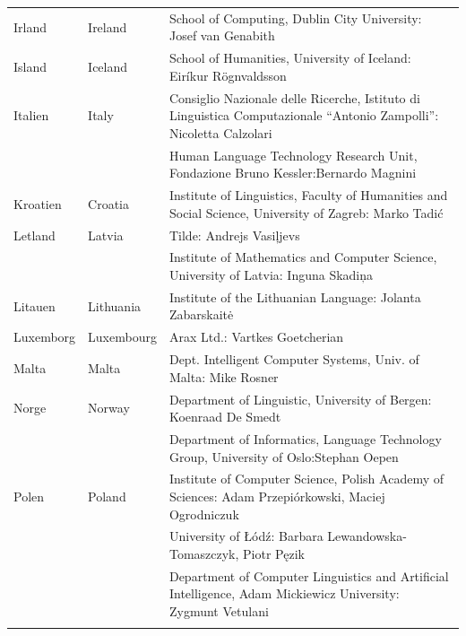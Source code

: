 \begin{longtable}{llp{105mm}}
  Irland & \textcolor{grey1}{Ireland} & School of Computing, Dublin City University: Josef van Genabith\\ \addlinespace
  
  Island & \textcolor{grey1}{Iceland} & School of Humanities, University of Iceland: Eiríkur Rögnvaldsson\\ \addlinespace
  
  Italien & \textcolor{grey1}{Italy} & Consiglio Nazionale delle Ricerche, Istituto di Linguistica Computazionale “Antonio Zampolli”: Nicoletta Calzolari\\ \addlinespace
  & & Human Language Technology Research Unit, Fondazione Bruno Kessler:\newline Bernardo Magnini\\ \addlinespace
  
  Kroatien & \textcolor{grey1}{Croatia} & Institute of Linguistics, Faculty of Humanities and Social Science, University of Zagreb: Marko Tadić \\ \addlinespace
  
  Letland & \textcolor{grey1}{Latvia} & Tilde: Andrejs Vasiļjevs\\ \addlinespace 
  & & Institute of Mathematics and Computer Science, University of Latvia: Inguna Skadiņa\\ \addlinespace
  
  Litauen & \textcolor{grey1}{Lithuania} & Institute of the Lithuanian Language: Jolanta Zabarskaitė\\ \addlinespace
  
  Luxemborg & \textcolor{grey1}{Luxembourg} & Arax Ltd.: Vartkes Goetcherian\\ \addlinespace
  
  Malta & \textcolor{grey1}{Malta} & Dept. Intelligent Computer Systems, Univ. of Malta: Mike Rosner\\ \addlinespace
  
  Norge & \textcolor{grey1}{Norway} & Department of Linguistic, University of Bergen: Koenraad De Smedt\\ \addlinespace 
  & & Department of Informatics, Language Technology Group, University of Oslo:\newline Stephan Oepen \\ \addlinespace
  
  Polen & \textcolor{grey1}{Poland} & Institute of Computer Science, Polish Academy of Sciences: Adam Przepiórkowski, Maciej Ogrodniczuk \\ \addlinespace
  & & University of Łódź: Barbara Lewandowska-Tomaszczyk, Piotr Pęzik\\ \addlinespace
  & & Department of Computer Linguistics and Artificial Intelligence, Adam Mickiewicz University: Zygmunt Vetulani \\ \addlinespace
  

\end{longtable}

